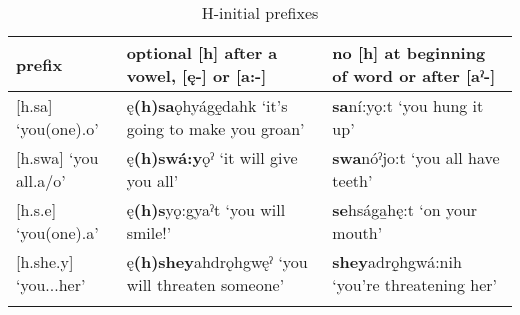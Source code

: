 \begin{table}
\caption{H-initial prefixes}
\label{tab:1:hinit}
\scriptsize{
\begin{tabularx}{\textwidth}{XXX}
\lsptoprule
prefix & optional [h] after a vowel, [ę-] or [a:-] & no [h] at beginning of word or after [aˀ-]\\
\midrule
{}[h.sa] ‘you(one).o’ & ę\textbf{(h)sa}ǫhyágę̱dahk ‘it’s going to make you groan’ & \textbf{sa}ní:yǫ:t ‘you hung it up’\\
{}[h.swa] ‘you all.a/o’ & ę\textbf{(h)swá:y}ǫˀ ‘it will give you all’ & \textbf{swa}nóˀjo:t ‘you all have teeth’\\
{}[h.s.e] ‘you(one).a’ & ę\textbf{(h)s}yǫ:gyaˀt ‘you will smile!’ & \textbf{se}hsága̱hę:t ‘on your mouth’\\
{}[h.she.y] ‘you...her’ & ę\textbf{(h)shey}ahdrǫhgwęˀ ‘you will threaten someone’ & \textbf{shey}adrǫ̱hgwá:nih ‘you’re threatening her’\\
\lspbottomrule
\end{tabularx}}
\end{table}





